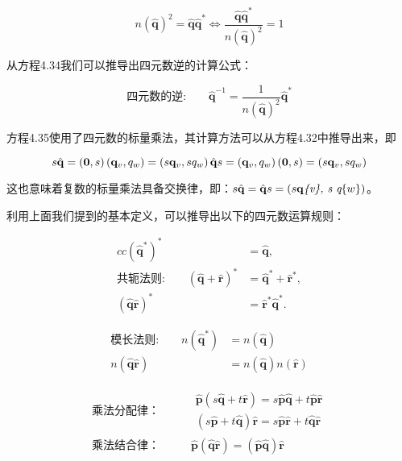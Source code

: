 \documentclass[
  paper=a4,
  ,captions=tableheading
]{scrartcl}
\begin{document}
\[
  n(\hat{\mathbf{q}})^{2}=\hat{\mathbf{q}} \hat{\mathbf{q}}^{*} \Longleftrightarrow \frac{\hat{\mathbf{q}} \hat{\mathbf{q}}^{*}}{n(\hat{\mathbf{q}})^{2}}=1
  \tag{4.34}
\]

从方程4.34我们可以推导出四元数逆的计算公式：

\[
  \textbf{四元数的逆:}\qquad \hat{\mathbf{q}}^{-1}=\frac{1}{n(\hat{\mathbf{q}})^{2}} \hat{\mathbf{q}}^{*}
  \tag{4.35}
\]

方程4.35使用了四元数的标量乘法，其计算方法可以从方程4.32中推导出来，即

\[
  s \hat{\mathbf{q}}=(\mathbf{0}, s)\left(\mathbf{q}_{v}, q_{w}\right)=\left(s \mathbf{q}_{v}, s q_{w}\right) \\
  \hat{\mathbf{q}} s =\left(\mathbf{q}_{v}, q_{w}\right)(\mathbf{0}, s) = \left(s \mathbf{q}_{v}, s q_{w}\right)
\]

这也意味着复数的标量乘法具备交换律，即：\( s \hat{\mathbf{q}} = \hat{\mathbf{q}} s = \left(s \mathbf{q}\emph{\{v\}, s q}\{w\}\right)\)。

利用上面我们提到的基本定义，可以推导出以下的四元数运算规则：

\[
  \begin{aligned}{cc}
    \left(\hat{\mathbf{q}}^{*}\right)^{*}                        & =\hat{\mathbf{q}},                           \\
    \textbf{共轭法则:} \qquad(\hat{\mathbf{q}}+\hat{\mathbf{r}})^{*} & =\hat{\mathbf{q}}^{*}+\hat{\mathbf{r}}^{*},  \\
    (\hat{\mathbf{q}} \hat{\mathbf{r}})^{*}                      & =\hat{\mathbf{r}}^{*} \hat{\mathbf{q}}^{*} .
  \end{aligned} \tag{4.36}
\]

\[
  \begin{aligned}
    \textbf{模长法则:} \qquad n\left(\hat{\mathbf{q}}^{*}\right) & =n(\hat{\mathbf{q}})                     \\
    n(\hat{\mathbf{q}} \hat{\mathbf{r}})                     & =n(\hat{\mathbf{q}}) n(\hat{\mathbf{r}})
  \end{aligned}\tag{4.37}
\]

\[
  \begin{aligned}{}
    \textbf{乘法分配律：} & \qquad
    \begin{array}{l}\hat{\mathbf{p}}(s \hat{\mathbf{q}}+t \hat{\mathbf{r}})=s \hat{\mathbf{p}} \hat{\mathbf{q}}+t \hat{\mathbf{p}} \hat{\mathbf{r}} \\
      (s \hat{\mathbf{p}}+t \hat{\mathbf{q}}) \hat{\mathbf{r}}=s \hat{\mathbf{p}} \hat{\mathbf{r}}+t \hat{\mathbf{q}} \hat{\mathbf{r}}
    \end{array} \\[5mm]
    \textbf{乘法结合律：} & \qquad \hat{\mathbf{p}}(\hat{\mathbf{q}} \hat{\mathbf{r}})=(\hat{\mathbf{p}} \hat{\mathbf{q}}) \hat{\mathbf{r}}
  \end{aligned}\tag{4.38}
\]
\end{document}

